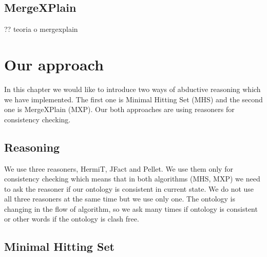 \documentclass[12pt,a4paper]{article}
\begin{document}
\subsection{MergeXPlain}
?? teoria o mergexplain

\section{Our approach}
In this chapter we would like to introduce two ways of abductive reasoning which we have implemented. The first one is Minimal Hitting Set (MHS) and the second one is MergeXPlain (MXP). Our both approaches are using reasoners for consistency checking. 

\subsection{Reasoning}
We use three reasoners, HermiT, JFact and Pellet. We use them only for consistency checking which means that in both algorithms (MHS, MXP) we need to ask the reasoner if our ontology is consistent in current state. We do not use all three reasoners at the same time but we use only one. The ontology is changing in the flow of algorithm, so we ask many times if ontology is consistent or other words if the ontology is clash free.

\subsection{Minimal Hitting Set}
\end{document}
